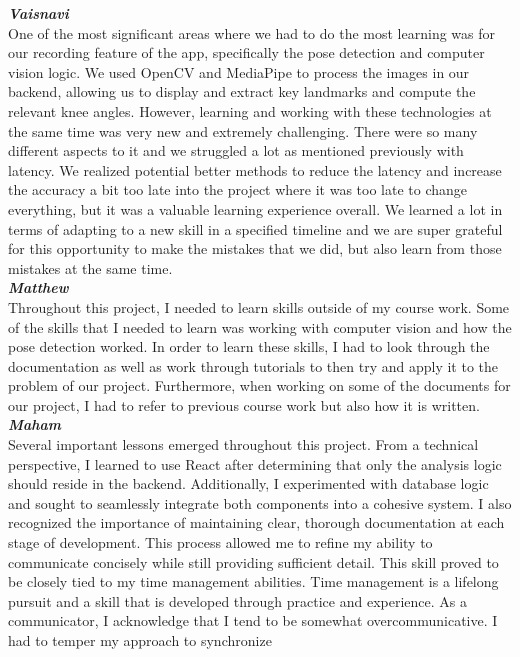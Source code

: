 \documentclass{article}
\begin{document}
\textit{\textbf{Vaisnavi}}\\
One of the most significant areas where we had to do the most learning was for our recording 
feature of the app, specifically the pose detection and computer vision logic. We used 
OpenCV and MediaPipe to process the images in our backend, allowing us to display and 
extract key landmarks and compute the relevant knee angles. However, learning and working 
with these technologies at the same time was very new and extremely challenging. There were so 
many different aspects to it and we struggled a lot as mentioned previously with latency. 
We realized potential better methods to reduce the latency and increase the accuracy a bit too 
late into the project where it was too late to change everything, but it was a valuable 
learning experience overall. We learned a lot in terms of adapting to a new skill in a 
specified timeline and we are super grateful for this opportunity to make the mistakes 
that we did, but also learn from those mistakes at the same time.\\
\newline
\textit{\textbf{Matthew}}\\
Throughout this project, I needed to learn skills outside of my course work. Some of the skills that I needed to learn was working with computer vision and how the pose detection worked. In order to learn these skills, I had to look through the documentation as well as work through tutorials to then try and apply it to the problem of our project. Furthermore, when working on some of the documents for our project, I had to refer to previous course work but also how it is written. \\
\newline
\textit{\textbf{Maham}}\\
Several important lessons emerged throughout this project. From a technical perspective, 
I learned to use React after determining that only the analysis logic should reside in the backend. 
Additionally, I experimented with database logic and sought to seamlessly integrate both components 
into a cohesive system.
I also recognized the importance of maintaining clear, thorough documentation at each stage of development. 
This process allowed me to refine my ability to communicate concisely while still providing sufficient detail. 
This skill proved to be closely tied to my time management abilities. Time management is a lifelong pursuit
and a skill that is developed through practice and experience.
As a communicator, I acknowledge that I tend to be somewhat overcommunicative. I had to temper my approach to synchronize
\end{document}
